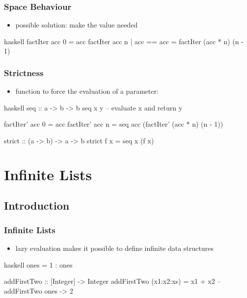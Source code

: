 \documentclass[dvipsnames]{beamer}
\theoremstyle{plain}
\begin{document}
\begin{frame}[fragile]
  \frametitle{Space Behaviour}

  \begin{itemize}
    \item possible solution: make the value needed
  \end{itemize}

  \begin{exampleblock}{}
    \begin{pygments}{haskell}
factIter acc 0 = acc
factIter acc n
  | acc == acc = factIter (acc * n) (n - 1)
    \end{pygments}
  \end{exampleblock}
\end{frame}

\begin{frame}[fragile]
  \frametitle{Strictness}

  \begin{itemize}
    \item function to force the evaluation of a parameter:
  \end{itemize}

  \begin{exampleblock}{}
    \begin{pygments}{haskell}
seq :: a -> b -> b
seq x y -- evaluate x and return y

factIter' acc 0 = acc
factIter' acc n = seq acc (factIter' (acc * n) (n - 1))

strict :: (a -> b) -> a -> b
strict f x = seq x (f x)
    \end{pygments}
  \end{exampleblock}
\end{frame}

\section{Infinite Lists}

\subsection{Introduction}

\begin{frame}[fragile]
  \frametitle{Infinite Lists}

  \begin{itemize}
    \item lazy evaluation makes it possible to define infinite data structures
  \end{itemize}

  \begin{exampleblock}{}
    \begin{pygments}{haskell}
ones = 1 : ones

addFirstTwo :: [Integer] -> Integer
addFirstTwo (x1:x2:xs) = x1 + x2
-- addFirstTwo ones -> 2
    \end{pygments}
  \end{exampleblock}
\end{frame}
\end{document}

